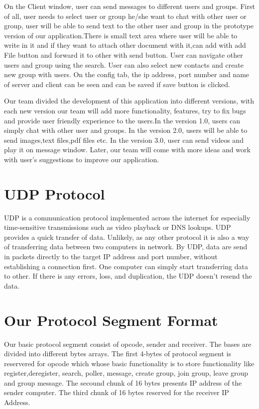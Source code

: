     \noindent
    On the Client window, user can send messages to different users and groups.
    First of all, user needs to select user or group he/she want to chat with other user or group,
    user will be able to send text to the other user and group in the prototype version of our
    application.There is small text area where user will be able to write in it and if they want
    to attach other document with it,can add with add File button and forward it to other with send
    button.
    User can navigate other users and group using the search.
    User can also select new contacts and create new group with users.
    On the config tab, the ip address, port number and name of server and client can be seen and
    can be saved if save button is clicked.
    \medskip
   
    \noindent
    Our team divided the development of this application into different versions, with each new
    version our team will add more functionality, features, try to fix bugs and provide user
    friendly experience to the users.In the version 1.0, users can simply chat with other user
    and groups.
    In the version 2.0, users will be able to send images,text files,pdf files etc.
    In the version 3.0, user can send videos and play it on message window.
    Later, our team will come with more ideas and work with user's suggestions to improve our
    application.
    \medskip

    \noindent

    \section{UDP Protocol}\label{sec:udp protocol}
    UDP is a communication protocol implemented across the internet for especially time-sensitive
    transmissions such as video playback or DNS lookups.
    UDP provides a quick transfer of data.
    Unlikely, as any other protocol it is also a way of transferring data between two computers in
    network.
    By UDP, data are send in packets directly to the target IP address and port number,
    without establishing a connection first.
    One computer can simply start transferring data to other.
    If there is any errors, loss, and duplication, the UDP doesn't resend the data.

    \medskip

    \noindent

    \section{Our Protocol Segment Format}\label{sec:our protocol}
    Our  basic protocol segment  consist of opcode, sender and receiver. 
    The bases are divided into different bytes arrays.
    The first 4-bytes of protocol segment is reservered for opcode which whose
     basic functionality is to store  functionality like register,deregister, search, 
     poller, message, create group, join group, leave group and group message.
    The secound chunk of 16 bytes presents IP address of the sender computer. 
    The third chunk of 16 bytes reserved for the receiver IP Address.
    \medskip
    
